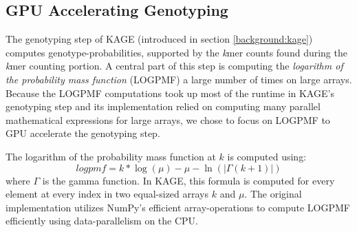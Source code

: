 \subsection{GPU Accelerating Genotyping} \label{methods:gpu_accelerating_genotyping}
The genotyping step of KAGE (introduced in section \ref{background:kage}) computes genotype-probabilities, supported by the \textit{k}mer counts found during the \textit{k}mer counting portion.
A central part of this step is computing the \textit{logarithm of the probability mass function} (LOGPMF) a large number of times on large arrays.
Because the LOGPMF computations took up most of the runtime in KAGE's genotyping step and its implementation relied on computing many parallel mathematical expressions for large arrays, we chose to focus on LOGPMF to GPU accelerate the genotyping step.

The logarithm of the probability mass function at $k$ is computed using:
\begin{equation} \label{methods:gpu_accelerating_genotyping:equations:logpmf}
  logpmf = k * \log(\mu) - \mu - \ln(|\Gamma(k + 1)|)
\end{equation}
where $\Gamma$ is the gamma function.
In KAGE, this formula is computed for every element at every index in two equal-sized arrays $k$ and $\mu$.
The original implementation utilizes NumPy's efficient array-operations to compute LOGPMF efficiently using data-parallelism on the CPU.

